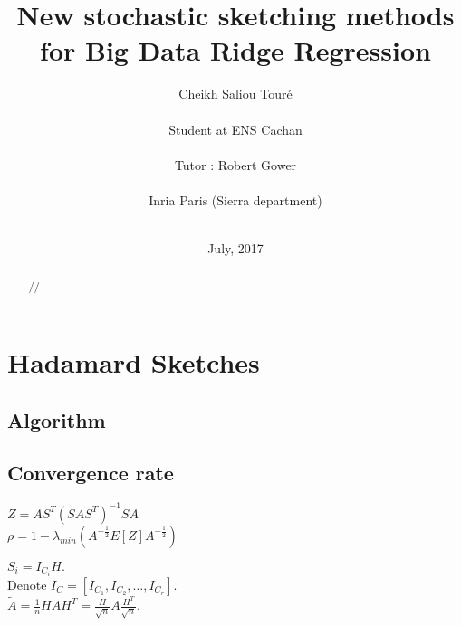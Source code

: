 




\title{New stochastic sketching methods for Big Data Ridge Regression}
\author{Cheikh Saliou Tour\'e \\ \\
Student at ENS Cachan\\\\
Tutor : Robert Gower \\ \\
Inria Paris (Sierra department)\\\\ }




\date{July, 2017}




\renewcommand\bibname{References}
\maketitle


\begin{abstract}

//

\end{abstract}
\tableofcontents
\newpage

\chapter{Hadamard Sketches}

%
%
%


\section{Algorithm}


\section{Convergence rate}

$Z = A S^{T} (S A S^{T})^{-1} S A$\\


$\rho = 1 - \lambda_{min}(A^{-\frac12}E[Z]A^{-\frac12}  )$

$S_{i} = I_{C_{i}} H.$\\

Denote $I_{C} = [I_{C_{1}},I_{C_{2}},\dots,I_{C_{r}}].$\\
$\tilde{A} = \frac{1}{n} H A H^{T} = \frac{H}{\sqrt{n}} A \frac{H^{T}}{\sqrt{n}}.$\\

